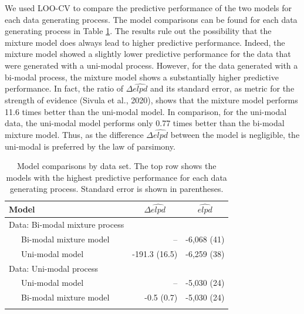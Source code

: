 \documentclass[
  english,
  man,floatsintext]{apa7}
\begin{document}
\begin{appendix}
\begin{table}[tbp]
\begin{center}
\begin{threeparttable}
\end{threeparttable}
\end{center}

\end{table}

We used LOO-CV to compare the predictive performance of the two models
for each data generating process. The model comparisons can be found for
each data generating process in Table \ref{tab:loossim}. The results
rule out the possibility that the mixture model does always lead to
higher predictive performance. Indeed, the mixture model showed a
slightly lower predictive performance for the data that were generated
with a uni-modal process. However, for the data generated with a
bi-modal process, the mixture model shows a substantially higher
predictive performance. In fact, the ratio of \(\Delta\widehat{elpd}\)
and its standard error, as metric for the strength of evidence (Sivula
et al., 2020), shows that the mixture model performs 11.6 times better
than the uni-modal model. In comparison, for the uni-modal data, the
uni-modal model performs only 0.77 times better than the bi-modal
mixture model. Thus, as the difference \(\Delta\widehat{elpd}\) between
the model is negligible, the uni-modal is preferred by the law of
parsimony.

\begin{table}[tbp]

\begin{center}
\begin{threeparttable}

\caption{\label{tab:loossim}Model comparisons by data set. The top row shows the models with the highest predictive performance for each data generating process. Standard error is shown in parentheses.}

\begin{tabular}{lrr}
\toprule
Model & \multicolumn{1}{c}{$\Delta\widehat{elpd}$} & \multicolumn{1}{c}{$\widehat{elpd}$}\\
\midrule
Data: Bi-modal mixture process &  & \\
\ \ \ Bi-modal mixture model & -- & -6,068 (41)\\
\ \ \ Uni-modal model & -191.3 (16.5) & -6,259 (38)\\
Data: Uni-modal process &  & \\
\ \ \ Uni-modal model & -- & -5,030 (24)\\
\ \ \ Bi-modal mixture model & -0.5 (0.7) & -5,030 (24)\\
\bottomrule
\addlinespace
\end{tabular}


\end{threeparttable}
\end{center}
\end{table}
\end{appendix}
\end{document}
